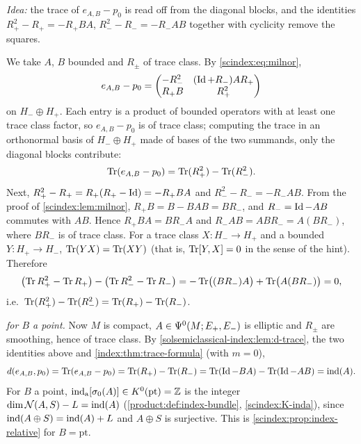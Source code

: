 \subsection*{}

\emph{Idea:} the trace of $e_{A,B}-p_0$ is read off from the diagonal blocks, and
the identities $R_+^2-R_+=-R_+BA$, $R_-^2-R_-=-R_-AB$ together with cyclicity
remove the squares.

We take $A$, $B$ bounded and $R_\pm$ of trace class. By \eqref{scindex:eq:milnor},
\begin{equation*}
  e_{A,B}-p_0=\begin{pmatrix}-R_-^2&(\operatorname{Id}+R_-)AR_+\\R_+B&R_+^2\end{pmatrix}
\end{equation*}
on $H_-\oplus H_+$. Each entry is a product of bounded operators with at least one
trace class factor, so $e_{A,B}-p_0$ is of trace class; computing the trace in an
orthonormal basis of $H_-\oplus H_+$ made of bases of the two summands, only the
diagonal blocks contribute:
\begin{equation*}
  \operatorname{Tr}(e_{A,B}-p_0)=\operatorname{Tr}(R_+^2)-\operatorname{Tr}(R_-^2).
\end{equation*}
Next, $R_+^2-R_+=R_+(R_+-\operatorname{Id})=-R_+BA$ and $R_-^2-R_-=-R_-AB$. From the proof of
\cref{scindex:lem:milnor}, $R_+B=B-BAB=BR_-$, and $R_-=\operatorname{Id}-AB$ commutes with $AB$.
Hence $R_+BA=BR_-A$ and $R_-AB=ABR_-=A(BR_-)$, where $BR_-$ is of trace class. For
a trace class $X:H_-\to H_+$ and a bounded $Y:H_+\to H_-$, $\operatorname{Tr}(YX)=\operatorname{Tr}(XY)$ (that
is, $\operatorname{Tr}[Y,X]=0$ in the sense of the hint). Therefore
\begin{equation*}
  \bigl(\operatorname{Tr} R_+^2-\operatorname{Tr} R_+\bigr)-\bigl(\operatorname{Tr} R_-^2-\operatorname{Tr} R_-\bigr)
  =-\operatorname{Tr}\bigl((BR_-)A\bigr)+\operatorname{Tr}\bigl(A(BR_-)\bigr)=0,
\end{equation*}
i.e.\ $\operatorname{Tr}(R_+^2)-\operatorname{Tr}(R_-^2)=\operatorname{Tr}(R_+)-\operatorname{Tr}(R_-)$.

\emph{ for $B$ a point.} Now $M$ is compact,
$A\in\Psi^{0}(M;E_+,E_-)$ is elliptic and $R_\pm$ are smoothing, hence of trace
class. By \cref{solsemiclassical-index:lem:d-trace}, the two identities above and
\cref{index:thm:trace-formula} (with $m=0$),
\begin{equation*}
  d(e_{A,B},p_0)=\operatorname{Tr}(e_{A,B}-p_0)=\operatorname{Tr}(R_+)-\operatorname{Tr}(R_-)=\operatorname{Tr}(\operatorname{Id}-BA)-\operatorname{Tr}(\operatorname{Id}-AB)
  =\operatorname{ind}(A).
\end{equation*}
For $B$ a point, $\operatorname{ind}_{\mathrm{a}}[\sigma_0(A)]\in K^0(\mathrm{pt})=\mathbb{Z}$ is the integer
$\dim\mathcal N(A,S)-L=\operatorname{ind}(A)$ (\cref{product:def:index-bundle}, \ref{scindex:K-inda}),
since $\operatorname{ind}(A\oplus S)=\operatorname{ind}(A)+L$ and $A\oplus S$ is surjective. This is
\cref{scindex:prop:index-relative} for $B=\mathrm{pt}$.

